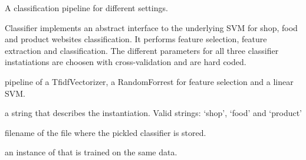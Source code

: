 \documentclass[letterpaper,10pt,english]{sphinxmanual}
\begin{document}
\begin{fulllineitems}
\label{\detokenize{api:classifier.Classifier}}
A classification pipeline for different settings.

Classifier implements an abstract interface to the underlying SVM
for shop, food and product websites classification. It performs
feature selection, feature extraction and classification. The
different parameters for all three classifier instatiations are
choosen with cross-validation and are hard coded.

\begin{fulllineitems}
\label{\detokenize{api:classifier.Classifier.pipeline}}
pipeline of a TfidfVectorizer, a RandomForrest for
feature selection and a linear SVM.

\end{fulllineitems}


\begin{fulllineitems}
\label{\detokenize{api:classifier.Classifier.type_}}
a string that describes the instantiation. Valid
strings: ‘shop’, ‘food’ and ‘product’

\end{fulllineitems}


\begin{fulllineitems}
\label{\detokenize{api:classifier.Classifier.filename}}
filename of the file where the pickled classifier
is stored.

\end{fulllineitems}


\begin{fulllineitems}
\label{\detokenize{api:classifier.Classifier.prob}}
an instance of  that is trained on the same
data.


\end{fulllineitems}
\end{fulllineitems}
\end{document}
